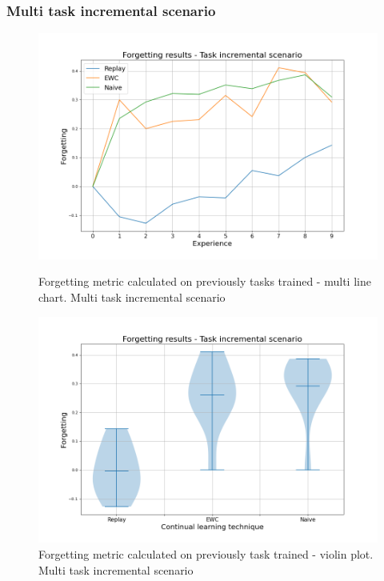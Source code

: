 \documentclass[english, LaM, oneside]{sapthesis}%
\begin{document}
\subsubsection{Multi task incremental scenario}
\begin{figure}[!ht]
   \begin{minipage}{0.48\textwidth}
     \centering
     \includegraphics[width=1.1\linewidth]{overview_forgetting_nc.png}
     \caption{Forgetting metric calculated on previously tasks trained - multi line chart. Multi task incremental scenario}\label{Fig:99}
   \end{minipage}\hfill
   \begin{minipage}{0.48\textwidth}
     \centering
     \includegraphics[width=1.1\linewidth]{overview2_forgetting_nc.png}
     \caption{Forgetting metric calculated on previously task trained - violin plot. Multi task incremental scenario}\label{Fig:100}
   \end{minipage}
\end{figure}
\end{document}
